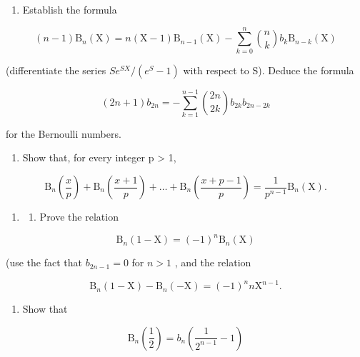 \begin{enumerate}
\def\labelenumi{\arabic{enumi})}
\setcounter{enumi}{1}
\tightlist
\item
  Establish the formula
\end{enumerate}

\[
(n - 1) \mathrm{B} _ {n} (\mathrm{X}) = n (\mathrm{X} - 1) \mathrm{B} _ {n - 1} (\mathrm{X}) - \sum_ {k = 0} ^ {n} \binom {n} {k} b _ {k}   \mathrm{B} _ {n - k} (\mathrm{X})
\]

(differentiate the series \(Se^{SX}/(e^{S}-1)\) with respect to S). Deduce the formula

\[
(2 n + 1) b _ {2 n} = - \sum_ {k = 1} ^ {n - 1} \binom {2 n} {2 k} b _ {2 k}   b _ {2 n - 2 k}
\]

for the Bernoulli numbers.

\begin{enumerate}
\def\labelenumi{\arabic{enumi})}
\setcounter{enumi}{2}
\tightlist
\item
  Show that, for every integer p \textgreater{} 1,
\end{enumerate}

\[
\mathrm{B} _ {n} \left(\frac {x}{p}\right) + \mathrm{B} _ {n} \left(\frac {x + 1}{p}\right) + \dots + \mathrm{B} _ {n} \left(\frac {x + p - 1}{p}\right) = \frac {1}{p ^ {n - 1}} \mathrm{B} _ {n} (\mathrm{X}).
\]

\begin{enumerate}
\def\labelenumi{\arabic{enumi})}
\setcounter{enumi}{3}
\tightlist
\item
  \begin{enumerate}
  \def\labelenumii{\alph{enumii})}
  \tightlist
  \item
    Prove the relation
  \end{enumerate}
\end{enumerate}

\[
\mathrm{B} _ {n} (1 - \mathrm{X}) = (- 1) ^ {n} \mathrm{B} _ {n} (\mathrm{X})
\]

(use the fact that \(b_{2n - 1} = 0\) for \(n > 1\) , and the relation

\[
\mathrm{B} _ {n} (1 - \mathrm{X}) - \mathrm{B} _ {n} (- \mathrm{X}) = (- 1) ^ {n} n \mathrm{X} ^ {n - 1}.
\]

\begin{enumerate}
\def\labelenumi{\alph{enumi})}
\setcounter{enumi}{1}
\tightlist
\item
  Show that
\end{enumerate}

\[
\mathrm{B} _ {n} \left(\frac {1}{2}\right) = b _ {n} \left(\frac {1}{2 ^ {n - 1}} - 1\right)
\]

